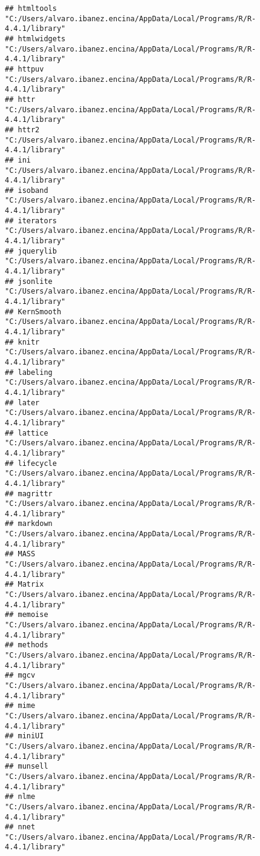 \documentclass[
]{article}
\begin{document}
\begin{verbatim}
## htmltools          "C:/Users/alvaro.ibanez.encina/AppData/Local/Programs/R/R-4.4.1/library"
## htmlwidgets        "C:/Users/alvaro.ibanez.encina/AppData/Local/Programs/R/R-4.4.1/library"
## httpuv             "C:/Users/alvaro.ibanez.encina/AppData/Local/Programs/R/R-4.4.1/library"
## httr               "C:/Users/alvaro.ibanez.encina/AppData/Local/Programs/R/R-4.4.1/library"
## httr2              "C:/Users/alvaro.ibanez.encina/AppData/Local/Programs/R/R-4.4.1/library"
## ini                "C:/Users/alvaro.ibanez.encina/AppData/Local/Programs/R/R-4.4.1/library"
## isoband            "C:/Users/alvaro.ibanez.encina/AppData/Local/Programs/R/R-4.4.1/library"
## iterators          "C:/Users/alvaro.ibanez.encina/AppData/Local/Programs/R/R-4.4.1/library"
## jquerylib          "C:/Users/alvaro.ibanez.encina/AppData/Local/Programs/R/R-4.4.1/library"
## jsonlite           "C:/Users/alvaro.ibanez.encina/AppData/Local/Programs/R/R-4.4.1/library"
## KernSmooth         "C:/Users/alvaro.ibanez.encina/AppData/Local/Programs/R/R-4.4.1/library"
## knitr              "C:/Users/alvaro.ibanez.encina/AppData/Local/Programs/R/R-4.4.1/library"
## labeling           "C:/Users/alvaro.ibanez.encina/AppData/Local/Programs/R/R-4.4.1/library"
## later              "C:/Users/alvaro.ibanez.encina/AppData/Local/Programs/R/R-4.4.1/library"
## lattice            "C:/Users/alvaro.ibanez.encina/AppData/Local/Programs/R/R-4.4.1/library"
## lifecycle          "C:/Users/alvaro.ibanez.encina/AppData/Local/Programs/R/R-4.4.1/library"
## magrittr           "C:/Users/alvaro.ibanez.encina/AppData/Local/Programs/R/R-4.4.1/library"
## markdown           "C:/Users/alvaro.ibanez.encina/AppData/Local/Programs/R/R-4.4.1/library"
## MASS               "C:/Users/alvaro.ibanez.encina/AppData/Local/Programs/R/R-4.4.1/library"
## Matrix             "C:/Users/alvaro.ibanez.encina/AppData/Local/Programs/R/R-4.4.1/library"
## memoise            "C:/Users/alvaro.ibanez.encina/AppData/Local/Programs/R/R-4.4.1/library"
## methods            "C:/Users/alvaro.ibanez.encina/AppData/Local/Programs/R/R-4.4.1/library"
## mgcv               "C:/Users/alvaro.ibanez.encina/AppData/Local/Programs/R/R-4.4.1/library"
## mime               "C:/Users/alvaro.ibanez.encina/AppData/Local/Programs/R/R-4.4.1/library"
## miniUI             "C:/Users/alvaro.ibanez.encina/AppData/Local/Programs/R/R-4.4.1/library"
## munsell            "C:/Users/alvaro.ibanez.encina/AppData/Local/Programs/R/R-4.4.1/library"
## nlme               "C:/Users/alvaro.ibanez.encina/AppData/Local/Programs/R/R-4.4.1/library"
## nnet               "C:/Users/alvaro.ibanez.encina/AppData/Local/Programs/R/R-4.4.1/library"

\end{verbatim}
\end{document}
